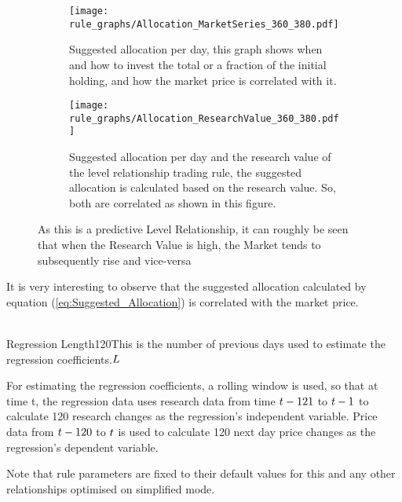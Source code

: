 \documentclass{article}%
\begin{document}
{\begin{figure}[H]
 \begin{subfigure}{0.48\textwidth}
\texttt{[image: rule\_graphs/Allocation\_MarketSeries\_360\_380.pdf]}
\caption{Suggested allocation per day, this graph shows when and how to invest the total or a fraction of the initial holding, and how the market price is correlated with it.}
\label{fig:02}
\end{subfigure}
\quad
\begin{subfigure}{0.48\textwidth}
\texttt{[image: rule\_graphs/Allocation\_ResearchValue\_360\_380.pdf]}
\caption{Suggested allocation per day and the research value of the level relationship trading rule, the suggested allocation is calculated based on the research value. So, both are correlated as shown in this figure. }
\label{fig:04}
\end{subfigure}
\caption{As this is a predictive Level Relationship, it can roughly be seen that when the Research Value is high, the Market tends to subsequently rise and vice-versa}
\end{figure}
\justify  It is very interesting to observe that the suggested allocation calculated by equation (\ref{eq:Suggested_Allocation}) is correlated with the market price.

\\
\vspace{1mm}
\fixedruleparameters
{Regression Length}{120}{This is the number of previous days used to estimate the regression coefficients.}{$L$}%
\stoptable 

\vspace{1mm}
\justify For estimating the regression coefficients, a rolling window is used, so that at time t, the
regression data uses research data from time $t - 121$ to $t - 1$ to calculate 120 research changes as the regression’s independent variable. Price data from $t - 120$ to $t$ is used to calculate 120 next day price changes as the regression’s dependent variable. 

\vspace{1mm}
\justify Note that rule parameters are fixed to their default values for this and any other relationships optimised on simplified mode.
} %



\assumptions%
\newpage
\keyterms%
\furtherlinks%

\appendixinfertrade{

\vspace{1mm}

\regressionanderrorpartone

}
\end{document}
